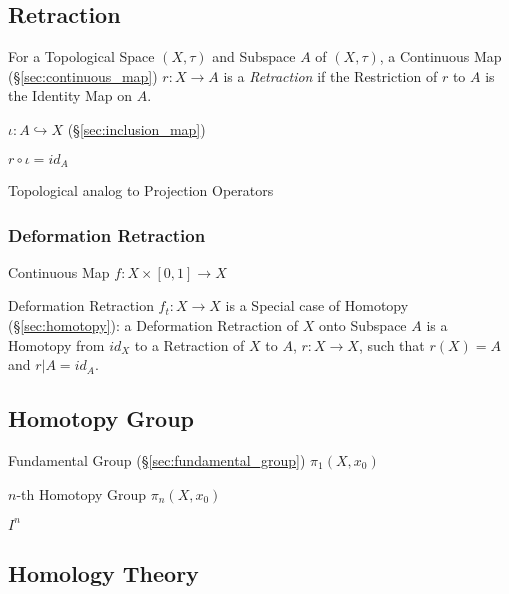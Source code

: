 \subsection{Retraction}\label{sec:subspace_retraction}

For a Topological Space $(X, \tau)$ and Subspace $A$ of $(X,\tau)$, a
Continuous Map (\S\ref{sec:continuous_map}) $r : X \rightarrow A$ is a
\emph{Retraction} if the Restriction of $r$ to $A$ is the Identity Map
on $A$.

$\iota : A \hookrightarrow X$ (\S\ref{sec:inclusion_map})

$r \circ \iota = id_A$

Topological analog to Projection Operators %
\cite{hatcher02}



\subsubsection{Deformation Retraction}\label{sec:deformation_retraction}

Continuous Map $f : X \times [0,1] \rightarrow X$

Deformation Retraction $f_t : X \rightarrow X$ is a Special case of
Homotopy (\S\ref{sec:homotopy}): a Deformation Retraction of $X$ onto
Subspace $A$ is a Homotopy from $id_X$ to a Retraction of $X$ to $A$,
$r : X \rightarrow X$, such that $r(X) = A$ and $r | A = id_A$.
\cite{hatcher02}



\subsection{Homotopy Group}\label{sec:homotopy_group}

Fundamental Group (\S\ref{sec:fundamental_group}) $\pi_1(X,x_0)$

$n$-th Homotopy Group $\pi_n(X,x_0)$

$I^n$



\subsection{Homology Theory}\label{sec:homology_theory}

